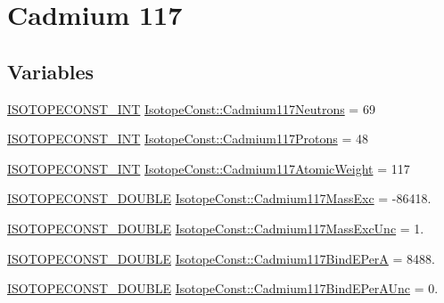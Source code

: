 \hypertarget{group___isotope_const-_cadmium-_cd117}{}\section{Cadmium 117}
\label{group___isotope_const-_cadmium-_cd117}
\subsection*{Variables}
\begin{DoxyCompactItemize}
\item 
\mbox{\hyperlink{group___isotope_const-_macros_ga5f18360b3e99483a35c32d789e62621c}{I\+S\+O\+T\+O\+P\+E\+C\+O\+N\+S\+T\+\_\+\+I\+NT}} \mbox{\hyperlink{group___isotope_const-_cadmium-_cd117_gaa5327584393ab71d2be53c435517352a}{Isotope\+Const\+::\+Cadmium117\+Neutrons}} = 69
\item 
\mbox{\hyperlink{group___isotope_const-_macros_ga5f18360b3e99483a35c32d789e62621c}{I\+S\+O\+T\+O\+P\+E\+C\+O\+N\+S\+T\+\_\+\+I\+NT}} \mbox{\hyperlink{group___isotope_const-_cadmium-_cd117_ga6b10d7b3fe8580ef7fa868be1e16c29b}{Isotope\+Const\+::\+Cadmium117\+Protons}} = 48
\item 
\mbox{\hyperlink{group___isotope_const-_macros_ga5f18360b3e99483a35c32d789e62621c}{I\+S\+O\+T\+O\+P\+E\+C\+O\+N\+S\+T\+\_\+\+I\+NT}} \mbox{\hyperlink{group___isotope_const-_cadmium-_cd117_ga1c1132eb5637943a89a3b95ea3f2f3c6}{Isotope\+Const\+::\+Cadmium117\+Atomic\+Weight}} = 117
\item 
\mbox{\hyperlink{group___isotope_const-_macros_ga8f45a7272ce02c0b4c65c44636ed719a}{I\+S\+O\+T\+O\+P\+E\+C\+O\+N\+S\+T\+\_\+\+D\+O\+U\+B\+LE}} \mbox{\hyperlink{group___isotope_const-_cadmium-_cd117_ga28ca716c97d09e109d03983aa5fc4d32}{Isotope\+Const\+::\+Cadmium117\+Mass\+Exc}} = -\/86418.
\item 
\mbox{\hyperlink{group___isotope_const-_macros_ga8f45a7272ce02c0b4c65c44636ed719a}{I\+S\+O\+T\+O\+P\+E\+C\+O\+N\+S\+T\+\_\+\+D\+O\+U\+B\+LE}} \mbox{\hyperlink{group___isotope_const-_cadmium-_cd117_ga6eae578130da515764462be126e097b2}{Isotope\+Const\+::\+Cadmium117\+Mass\+Exc\+Unc}} = 1.
\item 
\mbox{\hyperlink{group___isotope_const-_macros_ga8f45a7272ce02c0b4c65c44636ed719a}{I\+S\+O\+T\+O\+P\+E\+C\+O\+N\+S\+T\+\_\+\+D\+O\+U\+B\+LE}} \mbox{\hyperlink{group___isotope_const-_cadmium-_cd117_ga6793133c93e328a6b65abef053a9afef}{Isotope\+Const\+::\+Cadmium117\+Bind\+E\+PerA}} = 8488.
\item 
\mbox{\hyperlink{group___isotope_const-_macros_ga8f45a7272ce02c0b4c65c44636ed719a}{I\+S\+O\+T\+O\+P\+E\+C\+O\+N\+S\+T\+\_\+\+D\+O\+U\+B\+LE}} \mbox{\hyperlink{group___isotope_const-_cadmium-_cd117_gad9c1af4f64dda674c9cbf046f2b2757a}{Isotope\+Const\+::\+Cadmium117\+Bind\+E\+Per\+A\+Unc}} = 0.

\end{DoxyCompactItemize}
